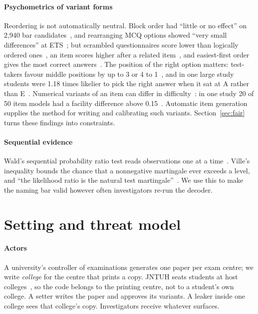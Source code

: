 \documentclass[10pt,a4paper]{article}
\theoremstyle{remark}
\begin{document}
\paragraph{Psychometrics of variant forms} Reordering is not automatically neutral. Block order had \enquote{little or no effect} on 2{,}940 bar candidates~\citep{klein1983}, and rearranging MCQ options showed \enquote{very small differences} at ETS~\citep{wang2019}; but scrambled questionnaires score lower than logically ordered ones~\citep{raux2017}, an item scores higher after a related item~\citep{haasnoot2026}, and easiest-first order gives the most correct answers~\citep{anaya2021}. The position of the right option matters: test-takers favour middle positions by up to 3 or 4 to 1~\citep{attali2003}, and in one large study students were 1.18 times likelier to pick the right answer when it sat at A rather than E~\citep{lions2023}. Numerical variants of an item can differ in difficulty~\citep{glas2003}: in one study 20 of 50 item models had a facility difference above 0.15~\citep{westacott2023}. Automatic item generation~\citep{gierl2012} supplies the method for writing and calibrating such variants. Section~\ref{sec:fair} turns these findings into constraints.

\paragraph{Sequential evidence} Wald's sequential probability ratio test reads observations one at a time~\citep{wald1945}. Ville's inequality bounds the chance that a nonnegative martingale ever exceeds a level, and \enquote{the likelihood ratio is the natural test martingale}~\citep{ville1939,ramdas2023}. We use this to make the naming bar valid however often investigators re-run the decoder.

\section{Setting and threat model}
\label{sec:threat}

\paragraph{Actors} A university's controller of examinations generates one paper per exam centre; we write \emph{college} for the centre that prints a copy. JNTUH seats students at host colleges~\citep{jntuh2018news}, so the code belongs to the printing centre, not to a student's own college. A setter writes the paper and approves its variants. A leaker inside one college sees that college's copy. Investigators receive whatever surfaces.
\end{document}
